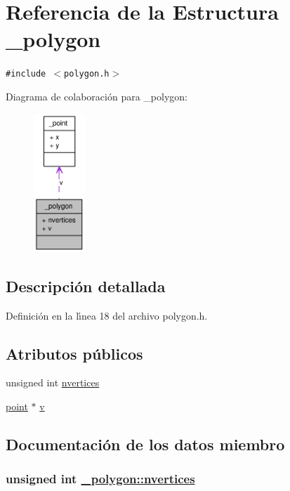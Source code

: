 \hypertarget{struct__polygon}{
\section{Referencia de la Estructura \_\-polygon}
\label{struct__polygon}
}
{\tt \#include $<$polygon.h$>$}

Diagrama de colaboraci\'{o}n para \_\-polygon:\begin{figure}[H]
\begin{center}
\leavevmode
\includegraphics[width=55pt]{struct__polygon__coll__graph}
\end{center}
\end{figure}


\subsection{Descripci\'{o}n detallada}




Definici\'{o}n en la l\'{\i}nea 18 del archivo polygon.h.\subsection*{Atributos p\'{u}blicos}
\begin{CompactItemize}
\item 
unsigned int \hyperlink{struct__polygon_32b823ec27d32ee03ab132c173d3672a_32b823ec27d32ee03ab132c173d3672a}{nvertices}
\item 
\hyperlink{struct__point}{point} $\ast$ \hyperlink{struct__polygon_32ccf29956c65625eddb9f4c75ce0f0c_32ccf29956c65625eddb9f4c75ce0f0c}{v}
\end{CompactItemize}


\subsection{Documentaci\'{o}n de los datos miembro}
\hypertarget{struct__polygon_32b823ec27d32ee03ab132c173d3672a_32b823ec27d32ee03ab132c173d3672a}{
\subsubsection[nvertices]{\setlength{\rightskip}{0pt plus 5cm}unsigned int \hyperlink{struct__polygon_32b823ec27d32ee03ab132c173d3672a_32b823ec27d32ee03ab132c173d3672a}{\_\-polygon::nvertices}}}
\label{struct__polygon_32b823ec27d32ee03ab132c173d3672a_32b823ec27d32ee03ab132c173d3672a}




